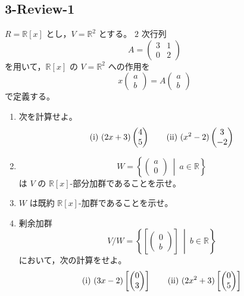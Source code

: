 
\subsection{3-Review-1}
\begin{exercise}
	\(R=\mathbb{R}[x]\) とし，\(V=\mathbb{R}^2\) とする。
	\(2\) 次行列
	\[
	A=
	\begin{pmatrix}
		3 & 1\\
		0 & 2
	\end{pmatrix}
	\]
	を用いて，\(\mathbb{R}[x]\) の \(V=\mathbb{R}^2\) への作用を
	\[
	x
	\begin{pmatrix}
		a\\
		b
	\end{pmatrix}
	=
	A
	\begin{pmatrix}
		a\\
		b
	\end{pmatrix}
	\]
	で定義する。
	
	\begin{enumerate}
		\item 次を計算せよ。
		\[
		\text{\rm (i)}\ 
		(2x+3)
		\begin{pmatrix}
			4\\
			5
		\end{pmatrix}
		\qquad
		\text{\rm (ii)}\ 
		(x^2-2)
		\begin{pmatrix}
			3\\
			-2
		\end{pmatrix}
		\]
		
		\item
		\[
		W=
		\left\{
		\begin{pmatrix}
			a\\
			0
		\end{pmatrix}
		\ \middle|\ 
		a\in\mathbb{R}
		\right\}
		\]
		は \(V\) の \(\mathbb{R}[x]\)-部分加群であることを示せ。
		
		\item
		\(W\) は既約 \(\mathbb{R}[x]\)-加群であることを示せ。
		
		\item
		剰余加群
		\[
		V/W=
		\left\{
		\left[
		\begin{pmatrix}
			0\\
			b
		\end{pmatrix}
		\right]
		\ \middle|\ 
		b\in\mathbb{R}
		\right\}
		\]
		において，次の計算をせよ。
		\[
		\text{\rm (i)}\ 
		(3x-2)
		\left[
		\begin{pmatrix}
			0\\
			3
		\end{pmatrix}
		\right]
		\qquad
		\text{\rm (ii)}\ 
		(2x^2+3)
		\left[
		\begin{pmatrix}
			0\\
			5
		\end{pmatrix}
		\right]
		\]
	\end{enumerate}
\end{exercise}

